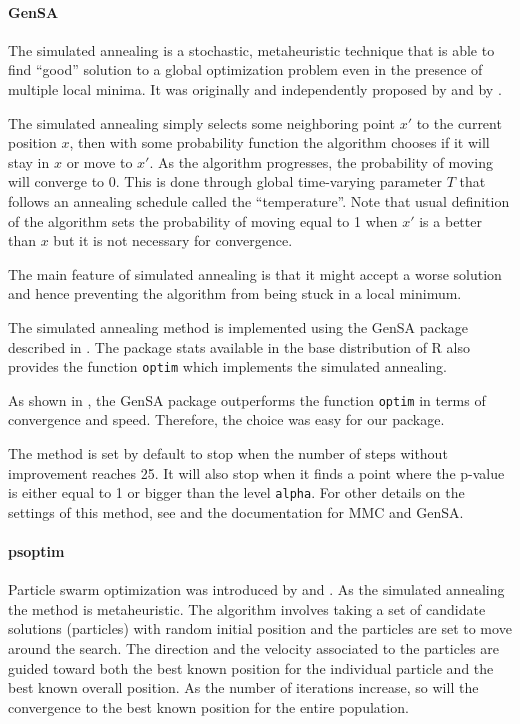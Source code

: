 \documentclass[]{article}\usepackage[]{graphicx}\usepackage[]{color}
\newcommand{\pkg}[1]{{\normalfont\fontseries{b}\selectfont #1}}
\let\proglang=\textsf
\let\code=\texttt
\begin{document}
	\paragraph{GenSA}

	The simulated annealing is a stochastic, metaheuristic technique that is able to find ``good'' solution to a global optimization problem even in the presence of multiple local minima. It was originally and independently proposed by \cite{kirkpatrick_optimization_1983} and by \cite{cerny_thermodynamical_1985}.

	The simulated annealing simply selects some neighboring point $x'$ to the current position $x$, then with some probability function the algorithm chooses if it will stay in $x$ or move to $x'$. As the algorithm progresses, the probability of moving will converge to 0. This is done through global time-varying parameter $T$ that follows an annealing schedule called the ``temperature''.  Note that usual definition of the algorithm sets the probability of moving equal to 1 when $x'$ is a better than $x$ but it is not necessary for convergence.

	The main feature of simulated annealing is that it might accept a worse solution and hence preventing the algorithm from being stuck in a local minimum.

	The simulated annealing method is implemented using the \pkg{GenSA} package described in \cite{yang_xiang_generalized_2013}. The package \pkg{stats} available in the base distribution of \proglang{R} also provides the function \code{optim} which implements the simulated annealing.

	As shown in \cite{mullen_continuous_2014}, the \pkg{GenSA} package outperforms the function \code{optim} in terms of convergence and speed. Therefore, the choice was easy for our package.

	The method is set by default to stop when the number of steps without improvement reaches 25. It will also stop when it finds a point where the p-value is either equal to 1 or bigger than the level \code{alpha}. For other details on the settings of this method, see \cite{yang_xiang_generalized_2013} and the documentation for \pkg{MMC} and \pkg{GenSA}.



	\paragraph{psoptim}


	Particle swarm optimization was introduced by \cite{eberhart_new_1995} and \cite{shi_modified_1998}. As the simulated annealing the method is metaheuristic. The algorithm involves taking a set of candidate solutions (particles) with random initial position and the particles are set to move around the search. The direction and the velocity associated to the particles are guided toward both the best known position for the individual particle and the best known overall position. As the number of iterations increase, so will the convergence to the best known position for the entire population.
\end{document}
